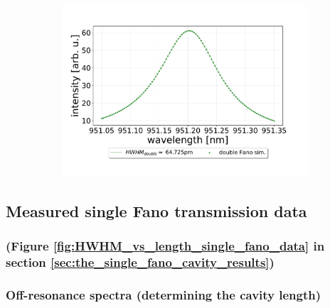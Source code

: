 \begin{figure}[h!]
\begin{subfigure}[b]{0.49\textwidth}
        \includegraphics[width=\textwidth]{figures/double_16percent_loss_30um.pdf}
        \caption{}
        \label{fig:16_percent_loss}
    \end{subfigure}
\end{figure}

\clearpage
\subsection{Measured single Fano transmission data}

\subsubsection*{(Figure \ref{fig:HWHM_vs_length_single_fano_data} in section \ref{sec:the_single_fano_cavity_results})}

\subsubsection*{Off-resonance spectra (determining the cavity length)}

